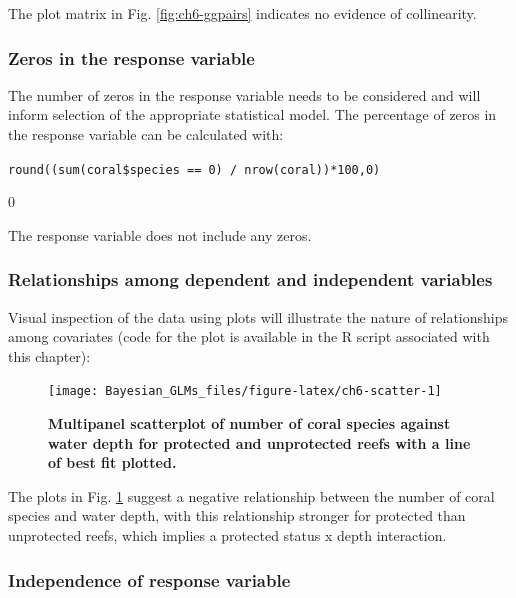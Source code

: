 \documentclass[
]{book}
\begin{document}
The plot matrix in Fig. \ref{fig:ch6-ggpairs} indicates no evidence of collinearity.

\hypertarget{nb-zeros}{%
\subsubsection{Zeros in the response variable}\label{nb-zeros}}

The number of zeros in the response variable needs to be considered and will inform selection of the appropriate statistical model. The percentage of zeros in the response variable can be calculated with:

\texttt{round((sum(coral\$species\ ==\ 0)\ /\ nrow(coral))*100,0)}

0

The response variable does not include any zeros.

\hypertarget{nb-rels}{%
\subsubsection{Relationships among dependent and independent variables}\label{nb-rels}}

Visual inspection of the data using plots will illustrate the nature of relationships among covariates (code for the plot is available in the R script associated with this chapter):



\begin{figure}

{\centering \texttt{[image: Bayesian\_GLMs\_files/figure-latex/ch6-scatter-1]} 

}

\caption{\textbf{Multipanel scatterplot of number of coral species against water depth for protected and unprotected reefs with a line of best fit plotted.}}\label{fig:ch6-scatter}
\end{figure}

The plots in Fig. \ref{fig:ch6-scatter} suggest a negative relationship between the number of coral species and water depth, with this relationship stronger for protected than unprotected reefs, which implies a protected status x depth interaction.

\hypertarget{nb-indep}{%
\subsubsection{Independence of response variable}\label{nb-indep}}
\end{document}
